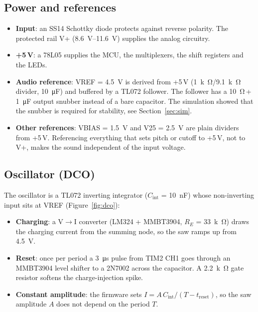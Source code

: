 \documentclass[11pt,a4paper]{article}
\begin{document}
\subsection{Power and references}
\begin{itemize}
  \item \textbf{Input}: an SS14 Schottky diode protects against reverse polarity. The protected rail V+
    (\SIrange{8.6}{11.6}{V}) supplies the analog circuitry.
  \item \textbf{+5\,V}: a 78L05 supplies the MCU, the multiplexers, the shift registers and the LEDs.
  \item \textbf{Audio reference}: VREF = \SI{4.5}{V} is derived from +5\,V (\SI{1}{k\ohm}/\SI{9.1}{k\ohm}
    divider, \SI{10}{\micro F}) and buffered by a TL072 follower. The follower has a
    \SI{10}{\ohm}\,+\,\SI{1}{\micro F} output snubber instead of a bare capacitor. The simulation showed
    that the snubber is required for stability, see Section~\ref{sec:sim}.
  \item \textbf{Other references}: VBIAS = \SI{1.5}{V} and V25 = \SI{2.5}{V} are plain dividers from +5\,V.
    Referencing everything that sets pitch or cutoff to +5\,V, not to V+, makes the sound independent of
    the input voltage.
\end{itemize}

\subsection{Oscillator (DCO)}
The oscillator is a TL072 inverting integrator ($C_\mathrm{int}$ = \SI{10}{nF}) whose non-inverting input sits at
VREF (Figure~\ref{fig:dco}):
\begin{itemize}
  \item \textbf{Charging}: a V$\to$I converter (LM324 + MMBT3904, $R_E$ = \SI{33}{k\ohm}) draws the
    charging current from the summing node, so the saw ramps up from \SI{4.5}{V}.
  \item \textbf{Reset}: once per period a \SI{3}{\micro s} pulse from TIM2 CH1 goes through an MMBT3904
    level shifter to a 2N7002 across the capacitor. A \SI{2.2}{k\ohm} gate resistor softens the
    charge-injection spike.
  \item \textbf{Constant amplitude}: the firmware sets
    $I = A\,C_\mathrm{int}/(T - t_\mathrm{reset})$, so the saw amplitude $A$ does not depend on the
    period $T$.
\end{itemize}
\end{document}
